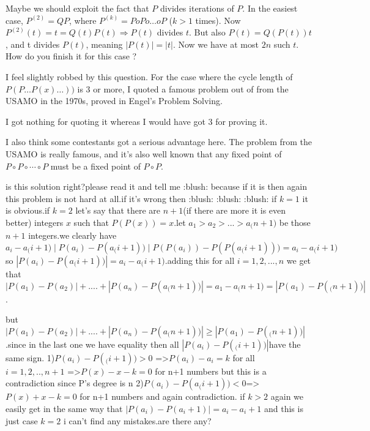 \begin{solution}
	Maybe we should exploit the fact that $P$ divides iterations of $P$. 
In the easiest case, $P^{(2)}=QP$, where $P^{(k)}=PoPo \dots oP$ ($k>1$ times). Now $P^{(2)}(t)=t=Q(t)P(t) \Rightarrow P(t)$ divides $t$. But also $P(t)=Q(P(t))t$, and t divides $P(t)$, meaning $|P(t)|=|t|$. Now we have at most $2n$ such $t$. How do you finish it for this case ?
\end{solution}



\begin{solution}
	I feel slightly robbed by this question. For the case where the cycle length of $P(P\ldots P(x) \ldots ))$ is 3 or more, I quoted a famous problem out of from the USAMO in the 1970s, proved in Engel's Problem Solving.

I got nothing for quoting it whereas I would have got 3 for proving it.
\end{solution}



\begin{solution}
	I also think some contestants got a serious advantage here. The problem from the USAMO is really famous, and it's also well known that any fixed point of $P \circ P \circ \cdots \circ P$ must be a fixed point of $P \circ P$.
\end{solution}



\begin{solution}
	is this solution right?please read it and tell me :blush: because if it is then again this problem is not hard at all.if it's wrong then :blush:  :blush:  :blush: if $k=1$ it is obvious.if $k=2$
let's say that there are  $n+1$(if there are more it is even better) integers $x$ such that $P(P(x))=x$.let $a_{1}> a_{2}>... > a_{(}n+1 )$ be those $n+1$ integers.we clearly have$a_{i}-a_{(}i+1) \mid P(a_{i})-P(a_{(}i+1)) \mid P(P(a_{i}))-P(P(a_{(}i+1)))=a_{i}-a_{(}i+1)$so $| P(a_{i})-P(a_{(}i+1)) |=a_{i}-a_{(}i+1)$.adding this for all $i=1,2,...,n$ we get that $|P(a_{1})-P(a_{2})|+....+|P(a_{n})-P(a_{(}n+1))|=a_{1}-a_{(}n+1)= |P(a_{1})-P(_{(}n+1))|$.

but$|P(a_{1})-P(a_{2})|+....+|P(a_{n})-P(a_{(}n+1))| \ge |P(a_{1})-P(_{(}n+1))|$.since in the last one we have equality then all $|P(a_{i})-P(_{(}i+1))|$have the same sign.
1)$P(a_{i})-P(_{(}i+1))>0$ =>$P(a_{i})-a_{i}=k$ for all $i=1,2,..,n+1$ =>$P(x)-x-k=0$ for n+1 numbers but this is a contradiction since P's degree is n
2)$P(a_{i})-P(a_{(}i+1))<0$=>$P(x)+x-k=0$ for n+1 numbers and again contradiction.
if $k>2$ again we easily get in the same way that $| P(a_{i})-P(a_{i}+1) |=a_{i}-a_{i}+1$ and this is just case $k=2$ 
i can't find any mistakes.are there any?
\end{solution}



